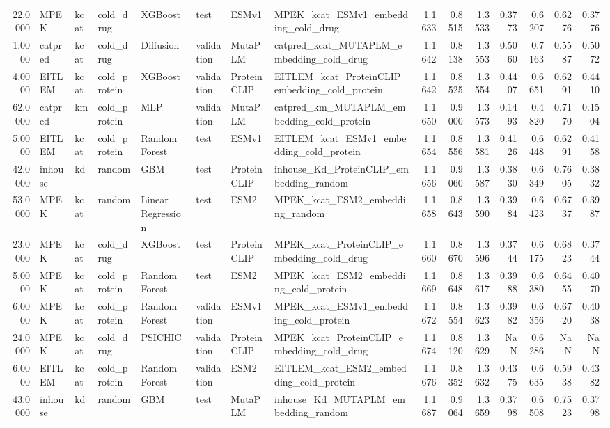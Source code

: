 \begin{tabular}{rlllllllrrrrrrr}
22.0000 & MPEK & kcat & cold_drug & XGBoost & test & ESMv1 & MPEK_kcat_ESMv1_embedding_cold_drug & 1.1633 & 0.8515 & 1.3533 & 0.3773 & 0.6207 & 0.6276 & 0.3776 \\
1.0000 & catpred & kcat & cold_drug & Diffusion & validation & MutaPLM & catpred_kcat_MUTAPLM_embedding_cold_drug & 1.1642 & 0.8138 & 1.3553 & 0.5060 & 0.7163 & 0.5587 & 0.5072 \\
4.0000 & EITLEM & kcat & cold_protein & XGBoost & validation & ProteinCLIP & EITLEM_kcat_ProteinCLIP_embedding_cold_protein & 1.1642 & 0.8525 & 1.3554 & 0.4407 & 0.6651 & 0.6291 & 0.4410 \\
62.0000 & catpred & km & cold_protein & MLP & validation & MutaPLM & catpred_km_MUTAPLM_embedding_cold_protein & 1.1650 & 0.9000 & 1.3573 & 0.1493 & 0.4820 & 0.7170 & 0.1504 \\
5.0000 & EITLEM & kcat & cold_protein & Random Forest & test & ESMv1 & EITLEM_kcat_ESMv1_embedding_cold_protein & 1.1654 & 0.8556 & 1.3581 & 0.4126 & 0.6448 & 0.6291 & 0.4158 \\
42.0000 & inhouse & kd & random & GBM & test & ProteinCLIP & inhouse_Kd_ProteinCLIP_embedding_random & 1.1656 & 0.9060 & 1.3587 & 0.3830 & 0.6349 & 0.7605 & 0.3832 \\
53.0000 & MPEK & kcat & random & Linear Regression & test & ESM2 & MPEK_kcat_ESM2_embedding_random & 1.1658 & 0.8643 & 1.3590 & 0.3984 & 0.6423 & 0.6737 & 0.3987 \\
23.0000 & MPEK & kcat & cold_drug & XGBoost & test & ProteinCLIP & MPEK_kcat_ProteinCLIP_embedding_cold_drug & 1.1660 & 0.8670 & 1.3596 & 0.3744 & 0.6175 & 0.6823 & 0.3744 \\
5.0000 & MPEK & kcat & cold_protein & Random Forest & test & ESM2 & MPEK_kcat_ESM2_embedding_cold_protein & 1.1669 & 0.8648 & 1.3617 & 0.3988 & 0.6380 & 0.6455 & 0.4070 \\
6.0000 & MPEK & kcat & cold_protein & Random Forest & validation & ESMv1 & MPEK_kcat_ESMv1_embedding_cold_protein & 1.1672 & 0.8554 & 1.3623 & 0.3982 & 0.6356 & 0.6720 & 0.4038 \\
24.0000 & MPEK & kcat & cold_drug & PSICHIC & validation & ProteinCLIP & MPEK_kcat_ProteinCLIP_embedding_cold_drug & 1.1674 & 0.8120 & 1.3629 & NaN & 0.6286 & NaN & NaN \\
6.0000 & EITLEM & kcat & cold_protein & Random Forest & validation & ESM2 & EITLEM_kcat_ESM2_embedding_cold_protein & 1.1676 & 0.8352 & 1.3632 & 0.4375 & 0.6635 & 0.5938 & 0.4382 \\
43.0000 & inhouse & kd & random & GBM & test & MutaPLM & inhouse_Kd_MUTAPLM_embedding_random & 1.1687 & 0.9064 & 1.3659 & 0.3798 & 0.6508 & 0.7523 & 0.3798 \\

\end{tabular}
